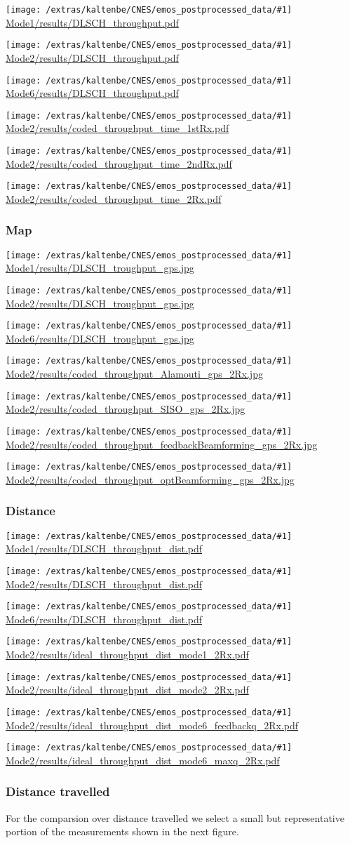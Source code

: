 \documentclass[a4paper,10pt]{article}
\newcommand{\printfile}[1]{
 \begin{minipage}{8cm}
  \centering
  \texttt{[image: /extras/kaltenbe/CNES/emos\_postprocessed\_data/\#1]}
  \url{#1}

 \end{minipage}
}
\begin{document}
\printfile{Mode1/results/DLSCH_throughput.pdf}
\printfile{Mode2/results/DLSCH_throughput.pdf}

\printfile{Mode6/results/DLSCH_throughput.pdf}
\printfile{Mode2/results/coded_throughput_time_1stRx.pdf}

\printfile{Mode2/results/coded_throughput_time_2ndRx.pdf}
\printfile{Mode2/results/coded_throughput_time_2Rx.pdf}

\subsubsection{Map}

\printfile{Mode1/results/DLSCH_troughput_gps.jpg}
\printfile{Mode2/results/DLSCH_troughput_gps.jpg}

\printfile{Mode6/results/DLSCH_troughput_gps.jpg}

\printfile{Mode2/results/coded_throughput_Alamouti_gps_2Rx.jpg}
\printfile{Mode2/results/coded_throughput_SISO_gps_2Rx.jpg}

\printfile{Mode2/results/coded_throughput_feedbackBeamforming_gps_2Rx.jpg}
\printfile{Mode2/results/coded_throughput_optBeamforming_gps_2Rx.jpg}

\subsubsection{Distance}

\printfile{Mode1/results/DLSCH_throughput_dist.pdf}
\printfile{Mode2/results/DLSCH_throughput_dist.pdf}

\printfile{Mode6/results/DLSCH_throughput_dist.pdf}


\printfile{Mode2/results/ideal_throughput_dist_mode1_2Rx.pdf}
%
\printfile{Mode2/results/ideal_throughput_dist_mode2_2Rx.pdf}

\printfile{Mode2/results/ideal_throughput_dist_mode6_feedbackq_2Rx.pdf}
%
\printfile{Mode2/results/ideal_throughput_dist_mode6_maxq_2Rx.pdf}

\subsubsection{Distance travelled}
For the comparsion over distance travelled we select a small but representative portion of the measurements shown in the next figure.
\end{document}
